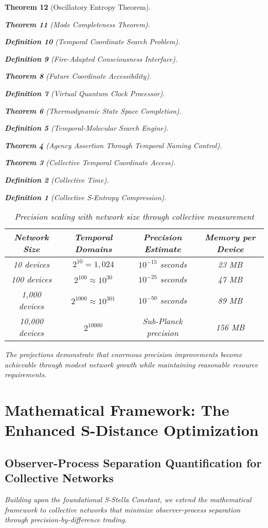 \documentclass[12pt,a4paper]{article}
\newtheorem{theorem}{Theorem}[section]
\newtheorem{definition}[theorem]{Definition}
\begin{document}
\begin{theorem}[Oscillatory Entropy Theorem]
\begin{theorem}[Mode Completeness Theorem]
\begin{enumerate}
\begin{definition}[Temporal Coordinate Search Problem]
\begin{algorithm}
\begin{definition}[Fire-Adapted Consciousness Interface]
\begin{theorem}[Future Coordinate Accessibility]
\begin{definition}[Virtual Quantum Clock Processor]
\begin{itemize}
\begin{itemize}
\begin{theorem}[Thermodynamic State Space Completion]
\begin{definition}[Temporal-Molecular Search Engine]
\begin{theorem}[Agency Assertion Through Temporal Naming Control]
\begin{remark}
\begin{theorem}[Collective Temporal Coordinate Access]
\begin{definition}[Collective Time]
\begin{definition}[Collective S-Entropy Compression]
\begin{table}[h]
\centering
\begin{tabular}{|c|c|c|c|}
\hline
\textbf{Network Size} & \textbf{Temporal Domains} & \textbf{Precision Estimate} & \textbf{Memory per Device} \\
\hline
10 devices & $2^{10} = 1,024$ & $10^{-15}$ seconds & 23 MB \\
100 devices & $2^{100} \approx 10^{30}$ & $10^{-25}$ seconds & 47 MB \\
1,000 devices & $2^{1000} \approx 10^{301}$ & $10^{-50}$ seconds & 89 MB \\
10,000 devices & $2^{10000}$ & Sub-Planck precision & 156 MB \\
\hline
\end{tabular}
\caption{Precision scaling with network size through collective measurement}
\end{table}

The projections demonstrate that enormous precision improvements become achievable through modest network growth while maintaining reasonable resource requirements.

\section{Mathematical Framework: The Enhanced S-Distance Optimization}

\subsection{Observer-Process Separation Quantification for Collective Networks}

Building upon the foundational S-Stella Constant, we extend the mathematical framework to collective networks that minimize observer-process separation through precision-by-difference trading.


\end{definition}
\end{definition}
\end{theorem}
\end{remark}
\end{theorem}
\end{definition}
\end{theorem}
\end{itemize}
\end{itemize}
\end{definition}
\end{theorem}
\end{definition}
\end{algorithm}
\end{definition}
\end{enumerate}
\end{theorem}
\end{theorem}
\end{document}
